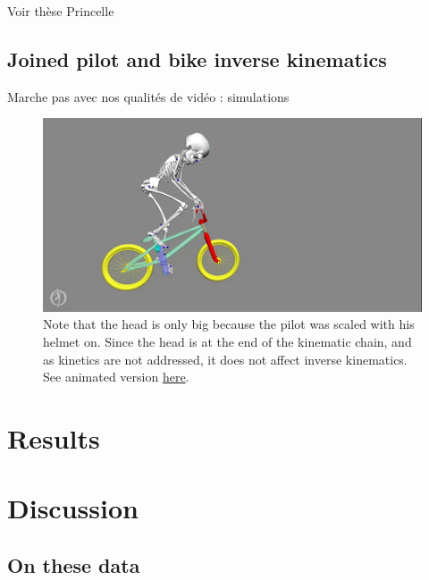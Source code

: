 Voir thèse Princelle


\subsection{Joined pilot and bike inverse kinematics}
Marche pas avec nos qualités de vidéo : simulations



\begin{figure}[hbtp]
	\centering
	\def\svgwidth{1\columnwidth}
	\fontsize{10pt}{10pt}\selectfont
	\includegraphics[width=\linewidth]{"../Chap7/Figures/BMXPilot.png"}
	\caption{Note that the head is only big because the pilot was scaled with his helmet on. Since the head is at the end of the kinematic chain, and as kinetics are not addressed, it does not affect inverse kinematics. See animated version \href{https://github.com/perfanalytics/pose2sim/blob/main/Content/Activities_verylow.gif}{here}.}
	\label{fig_bmxpilot}
\end{figure}




\section{Results}



\section{Discussion}
\subsection{On these data}


